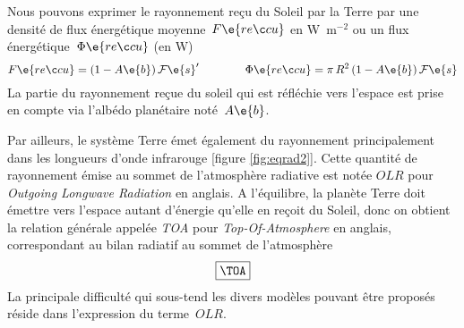 \sk
Nous pouvons exprimer le rayonnement reçu du Soleil par la Terre par une densité de flux énergétique moyenne~$F\e{reçu}$ en W~m$^{-2}$ ou un flux énergétique~$\Phi\e{reçu}$ (en W)
\[ 
F\e{reçu} = (1-A\e{b}) \, \mathcal{F}\e{s}' 
\qquad \qquad
\Phi\e{reçu} = \pi \, R^2 \, (1-A\e{b}) \, \mathcal{F}\e{s}
\] 
La partie du rayonnement reçue du soleil qui est réfléchie vers l'espace est prise en compte via l'albédo planétaire noté~$A\e{b}$.

\sk
Par ailleurs, le système Terre émet également du rayonnement principalement dans les longueurs d'onde infrarouge [figure \ref{fig:eqrad2}]. 
Cette quantité de rayonnement émise au sommet de l'atmosphère radiative est notée $OLR$ pour \emph{Outgoing Longwave Radiation} en anglais.
A l'équilibre, la planète Terre doit émettre vers l'espace autant d'énergie qu'elle en reçoit du Soleil, donc
on obtient la relation générale appelée \emph{TOA} pour \emph{Top-Of-Atmosphere} en anglais, correspondant
au bilan radiatif au sommet de l'atmosphère
\[ \boxed{\TOA} \] 
La principale difficulté qui sous-tend les divers modèles pouvant être proposés réside dans l'expression du terme~$OLR$.


